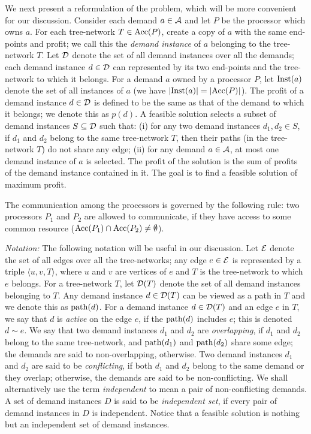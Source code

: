 \documentclass[11pt]{article}
\newcommand{\calA} {{\cal A}}
\newcommand{\calE} {{\cal E}}
\newcommand{\calD} {{\cal D}}
\newcommand{\Acc} {{\rm Acc}}
\newcommand{\Inst} {{\rm Inst}}
\newcommand{\mypath} {{\rm path}}
\begin{document}
We next present a reformulation of the problem, which will be more convenient for our discussion.
Consider each demand $a\in \calA$ and let $P$ be the processor which owns $a$.
For each tree-network $T\in \Acc(P)$, create a copy of $a$ with the same end-points and profit; 
we call this the {\em demand instance} of $a$ belonging to the tree-network $T$.
Let $\calD$ denote the set of all demand instances over all the demands;
each demand instance $d\in \calD$ can represented by its two end-points and the tree-network to which it belongs.
For a demand $a$ owned by a processor $P$, 
let $\Inst(a)$ denote the set of all instances of $a$ (we have $|\Inst(a)|=|\Acc(P)|$). 
The profit of a demand instance $d\in \calD$ is defined to be the same
as that of the demand to which it belongs; we denote this as $p(d)$.
A feasible solution selects a subset of demand instances $S\subseteq \calD$
such that: 
(i) for any two demand instances $d_1,d_2\in S$, if $d_1$ and $d_2$ belong to the same tree-network $T$,
then their paths (in the tree-network $T$) do not share any edge;
(ii) for any demand $a\in \calA$, at most one demand instance of $a$ is selected.
The profit of the solution is the sum of profits of the demand instance contained in it.
The goal is to find a feasible solution of maximum profit.

The communication among the processors is governed by the following rule:
two processors $P_1$ and $P_2$ are allowed to communicate, if
they have access to some common resource ($\Acc(P_1)\cap \Acc(P_2)\neq \emptyset$).

{\it Notation: }The following notation will be useful in our discussion.
Let $\calE$ denote the set of all edges over all the tree-networks;
any edge $e\in \calE$ is represented by a triple $\langle u, v, T\rangle$,
where $u$ and $v$ are vertices of $e$ and $T$ is the tree-network to which $e$ belongs.
For a tree-network $T$, let $\calD(T)$ denote the set of all demand instances belonging to $T$.
Any demand instance $d\in \calD(T)$ can be viewed as a path in $T$ and we denote this as $\mypath(d)$.
For a demand instance $d\in \calD(T)$ and an edge $e$ in $T$,
we say that $d$ is {\em active} on the edge $e$, if the $\mypath(d)$ includes $e$;
this is denoted $d\sim e$. We say that two demand instances $d_1$ and $d_2$ are
{\em overlapping}, if $d_1$ and $d_2$ belong to the same tree-network, 
and $\mypath(d_1)$ and $\mypath(d_2)$ share some edge;
the demands are said to non-overlapping, otherwise.
Two demand instances $d_1$ and $d_2$ are said to be {\em conflicting}, 
if both $d_1$ and $d_2$ belong to the same demand or they overlap;
otherwise, the demands are said to be non-conflicting.
We shall alternatively use the term {\em independent} to mean a pair of non-conflicting demands.
A set of demand instances $D$ is said to be {\em independent set},
if every pair of demand instances in $D$ is independent.
Notice that a feasible solution is nothing but an independent set of demand instances.
\end{document}
